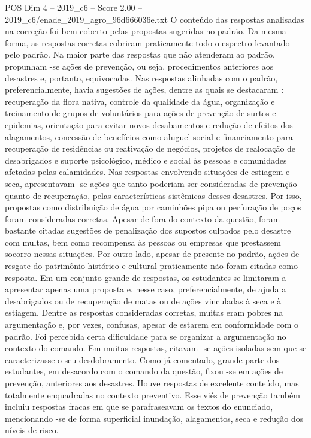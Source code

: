 \begin{textsample}{POS Dim 4 – 2019\_c6 – Score 2.00 – 2019\_c6/enade\_2019\_agro\_96d666036e.txt}
O conteúdo das respostas analisadas na correção foi bem coberto pelas propostas sugeridas no padrão.
Da mesma forma, as respostas corretas cobriram praticamente todo o espectro levantado pelo padrão.
Na maior parte das respostas que não atenderam ao padrão, propunham -se ações de prevenção, ou seja, procedimentos anteriores aos desastres e, portanto, equivocadas.
Nas respostas alinhadas com o padrão, preferencialmente, havia sugestões de ações, dentre as quais se destacaram : recuperação da flora nativa, controle da qualidade da água, organização e treinamento de grupos de voluntários para ações de prevenção de surtos e epidemias, orientação para evitar novos desabamentos e redução de efeitos dos alagamentos, concessão de benefícios como aluguel social e financiamento para recuperação de residências ou reativação de negócios, projetos de realocação de desabrigados e suporte psicológico, médico e social às pessoas e comunidades afetadas pelas calamidades.
Nas respostas envolvendo situações de estiagem e seca, apresentavam -se ações que tanto poderiam ser consideradas de prevenção quanto de recuperação, pelas características sistêmicas desses desastres.
Por isso, propostas como distribuição de água por caminhões pipa ou perfuração de poços foram consideradas corretas.
Apesar de fora do contexto da questão, foram bastante citadas sugestões de penalização dos supostos culpados pelo desastre com multas, bem como recompensa às pessoas ou empresas que prestassem socorro nessas situações.
Por outro lado, apesar de presente no padrão, ações de resgate do patrimônio histórico e cultural praticamente não foram citadas como resposta.
Em um conjunto grande de respostas, os estudantes se limitaram a apresentar apenas uma proposta e, nesse caso, preferencialmente, de ajuda a desabrigados ou de recuperação de matas ou de ações vinculadas à seca e à estiagem.
Dentre as respostas consideradas corretas, muitas eram pobres na argumentação e, por vezes, confusas, apesar de estarem em conformidade com o padrão.
Foi percebida certa dificuldade para se organizar a argumentação no contexto do comando.
Em muitas respostas, citavam -se ações isoladas sem que se caracterizasse o seu desdobramento.
Como já comentado, grande parte dos estudantes, em desacordo com o comando da questão, fixou -se em ações de prevenção, anteriores aos desastres.
Houve respostas de excelente conteúdo, mas totalmente enquadradas no contexto preventivo.
Esse viés de prevenção também incluiu respostas fracas em que se parafraseavam os textos do enunciado, mencionando -se de forma superficial inundação, alagamentos, seca e redução dos níveis de risco.

\end{textsample}
